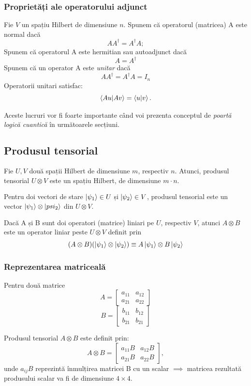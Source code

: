 \subsubsection{Proprietăți ale operatorului adjunct}

Fie $V$ un spațiu Hilbert de dimensiune $n$.
Spunem că operatorul (matricea) A este normal dacă
\[
AA^\dagger = A^\dagger A;
\]
Spunem că operatorul A este hermitian sau autoadjunct dacă 
\[
A = A^\dagger
\]
Spunem că un operator A este \textit{unitar} dacă
\[
A A^\dagger = A^\dagger A = I_n
\]
Operatorii unitari satisfac:
\[
\braket{Au|Av} = \braket{u|v}.
\]

Aceste lucruri vor fi foarte importante când voi prezenta conceptul de \textit{poartă logică cuantică} în următoarele secțiuni.

\subsection{Produsul tensorial}

Fie $U, V$ două spații Hilbert de dimensiune $m$, respectiv $n$. Atunci, produsul tensorial $U \otimes V$ este un spațiu Hilbert, de dimensiune $m \cdot n$.

Pentru doi vectori de stare $\ket{\psi_1} \in U$ și $\ket{\psi_2} \in V$, produsul tensorial este un vector $\ket{\psi_1} \otimes \ket{psi_2}$ din $U \otimes V$.

Dacă A și B sunt doi operatori (matrice) liniari pe $U$, respectiv $V$, atunci $A \otimes B$ este un operator liniar peste $U \otimes V$ definit prin
\[
(A \otimes B) (\ket{\psi_1} \otimes \ket{\psi_2}) \equiv A \ket{\psi_1} \otimes B \ket{\psi_2}
\]

\subsubsection{Reprezentarea matriceală}

Pentru două matrice 
\[
A = \begin{bmatrix}
a_{11} & a_{12} \\
a_{21} & a_{22}
\end{bmatrix}
\]
\[
B = \begin{bmatrix}
b_{11} & b_{12} \\
b_{21} & b_{21}
\end{bmatrix}
\]

Produsul tensorial $A \otimes B$ este definit prin:
\[
A \otimes B = \begin{bmatrix}
a_{11}B & a_{12}B \\
a_{21}B & a_{22}B
\end{bmatrix},
\]
unde $a_{ij}B$ reprezintă înmulțirea matricei B cu un scalar $\implies$ matricea rezultată produsului scalar va fi de dimensiune $4 \times 4$.




